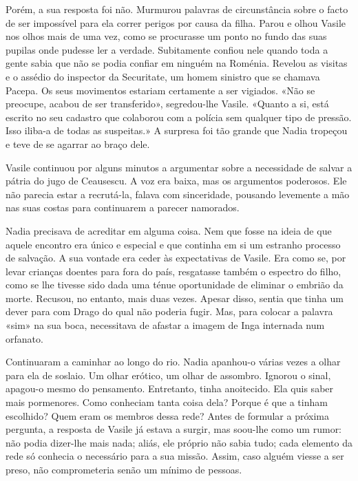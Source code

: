 Porém, a sua resposta foi não. Murmurou palavras de circunstância sobre
o facto de ser impossível para ela correr perigos por causa da filha.
Parou e olhou Vasile nos olhos mais de uma vez, como se procurasse um
ponto no fundo das suas pupilas onde pudesse ler a verdade. Subitamente confiou nele quando toda a gente sabia que não se podia confiar
em ninguém na Roménia. Revelou as visitas e o assédio do inspector da
Securitate, um homem sinistro que se chamava Pacepa. Os seus movimentos
estariam certamente a ser vigiados. «Não se preocupe, acabou de ser
transferido», segredou-lhe Vasile. «Quanto a si, está escrito no seu
cadastro que colaborou com a polícia sem qualquer tipo de pressão. Isso
iliba-a de todas as suspeitas.» A surpresa foi tão grande que Nadia
tropeçou e teve de se agarrar ao braço dele.

Vasile continuou por alguns minutos a argumentar
sobre a necessidade de salvar a pátria do jugo de Ceausescu. A voz era
baixa, mas os argumentos poderosos. Ele não parecia estar a recrutá-la,
falava com sinceridade, pousando levemente a mão nas suas costas para
continuarem a parecer namorados.

Nadia precisava de acreditar em alguma coisa. Nem que fosse na ideia de
que aquele encontro era único e especial e que continha em si um
estranho processo de salvação. A sua vontade era ceder às expectativas
de Vasile. Era como se, por levar crianças doentes para fora do país,
resgatasse também o espectro do filho, como se lhe tivesse sido dada uma
ténue oportunidade de eliminar o embrião da morte. Recusou, no entanto,
mais duas vezes. Apesar disso, sentia que tinha um dever para com Drago
do qual
não poderia fugir. Mas, para colocar a palavra «sim» na sua boca,
necessitava de afastar a imagem de Inga internada num orfanato.

Continuaram a caminhar ao longo do rio. Nadia apanhou-o várias vezes a
olhar para ela de soslaio. Um olhar erótico, um olhar de assombro.
Ignorou o sinal, apagou-o mesmo do pensamento. Entretanto, tinha
anoitecido. Ela quis saber mais pormenores. Como conheciam tanta coisa
dela? Porque é que a tinham escolhido? Quem eram os membros dessa rede?
Antes de formular a próxima pergunta, a resposta de Vasile já estava a
surgir, mas soou-lhe como um rumor: não podia dizer-lhe mais nada;
aliás, ele próprio não sabia tudo; cada elemento da rede só conhecia o
necessário para a sua missão. Assim, caso alguém viesse a ser preso, não
comprometeria senão um mínimo de pessoas.

